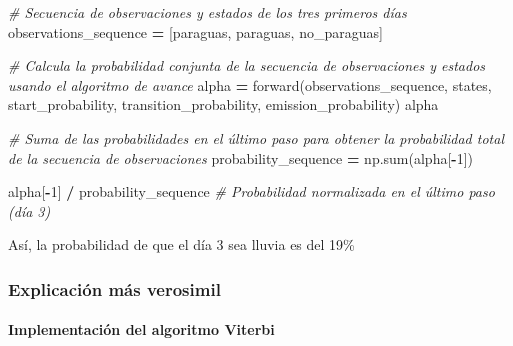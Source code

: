 \documentclass[
  a4paper,
  DIV=11,
  numbers=noendperiod]{scrreprt}
\let\oldparagraph\paragraph
\renewcommand{\paragraph}[1]{\oldparagraph{#1}\mbox{}}
\newenvironment{Shaded}{\begin{snugshade}}{\end{snugshade}}
\newcommand{\BuiltInTok}[1]{#1}
\newcommand{\CommentTok}[1]{\textcolor[rgb]{0.56,0.35,0.01}{\textit{#1}}}
\newcommand{\DecValTok}[1]{\textcolor[rgb]{0.00,0.00,0.81}{#1}}
\newcommand{\NormalTok}[1]{#1}
\newcommand{\OperatorTok}[1]{\textcolor[rgb]{0.81,0.36,0.00}{\textbf{#1}}}
\newcommand{\StringTok}[1]{\textcolor[rgb]{0.31,0.60,0.02}{#1}}
\begin{document}
\begin{Shaded}
\begin{Highlighting}[numbers=left,,]
\CommentTok{\# Secuencia de observaciones y estados de los tres primeros días}
\NormalTok{observations\_sequence }\OperatorTok{=}\NormalTok{ [}\StringTok{\textquotesingle{}paraguas\textquotesingle{}}\NormalTok{, }\StringTok{\textquotesingle{}paraguas\textquotesingle{}}\NormalTok{, }\StringTok{\textquotesingle{}no\_paraguas\textquotesingle{}}\NormalTok{]}

\CommentTok{\# Calcula la probabilidad conjunta de la secuencia de observaciones y estados usando el algoritmo de avance}
\NormalTok{alpha }\OperatorTok{=}\NormalTok{ forward(observations\_sequence, states, start\_probability, transition\_probability, emission\_probability)}
\NormalTok{alpha}
\end{Highlighting}
\end{Shaded}

\begin{Shaded}
\begin{Highlighting}[numbers=left,,]
\CommentTok{\# Suma de las probabilidades en el último paso para obtener la probabilidad total de la secuencia de observaciones}
\NormalTok{probability\_sequence }\OperatorTok{=}\NormalTok{ np.}\BuiltInTok{sum}\NormalTok{(alpha[}\OperatorTok{{-}}\DecValTok{1}\NormalTok{])}
\end{Highlighting}
\end{Shaded}

\begin{Shaded}
\begin{Highlighting}[numbers=left,,]
\NormalTok{alpha[}\OperatorTok{{-}}\DecValTok{1}\NormalTok{] }\OperatorTok{/}\NormalTok{ probability\_sequence }\CommentTok{\# Probabilidad normalizada en el último paso (día 3)}
\end{Highlighting}
\end{Shaded}

Así, la probabilidad de que el día 3 sea lluvia es del 19\%

\subsubsection{Explicación más
verosimil}\label{explicaciuxf3n-muxe1s-verosimil}

\paragraph{Implementación del algoritmo
Viterbi}\label{implementaciuxf3n-del-algoritmo-viterbi}
\end{document}
